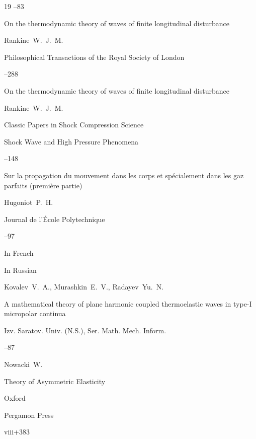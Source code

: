 \begin{thebibliography}{19}
--83


\moreref

\paper On the thermodynamic theory of waves of finite longitudinal disturbance

\by Rankine~W.~J.~M.

\jour Philosophical Transactions of the Royal Society of London 


--288


\moreref

\paper On the thermodynamic theory of waves of finite longitudinal disturbance

\by Rankine~W.~J.~M.


\inbook Classic Papers in Shock Compression Science

\serial Shock Wave and High Pressure Phenomena

--148









\paper Sur la propagation du mouvement dans les corps et sp\'ecialement dans les gaz parfaits (premi\`ere partie)

\by Hugoniot~P.~H.

\jour  Journal de l'\'Ecole Polytechnique



--97

\lang In French




\lang In Russian

\by Kovalev~V.~A., Murashkin~E.~V., Radayev~Yu.~N.

\paper A mathematical theory of plane harmonic coupled thermoelastic waves in type-I micropolar continua

\jour Izv. Saratov. Univ. (N.S.), Ser. Math. Mech. Inform.




--87




\by Nowacki~W.

\book Theory of Asymmetric Elasticity

\publaddr Oxford

\publ Pergamon Press


\totalpages viii+383



\end{thebibliography}


